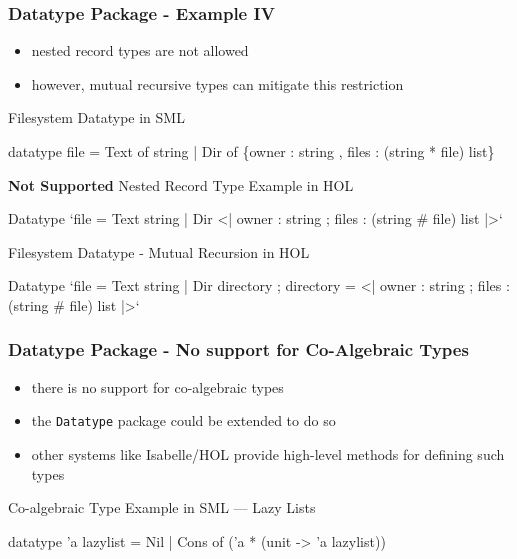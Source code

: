 \begin{frame}[fragile]
\frametitle{Datatype Package - Example IV}
\begin{itemize}
\item nested record types are not allowed
\item however, mutual recursive types can mitigate this restriction
\end{itemize}

\begin{block}{Filesystem Datatype in SML}
\begin{semiverbatim}\scriptsize
datatype file = Text of string
              | Dir of \{owner : string ,
                        files : (string * file) list\}
\end{semiverbatim}
\end{block}             

\begin{alertblock}{\textbf{Not Supported} Nested Record Type Example in HOL}
\begin{semiverbatim}\scriptsize
Datatype `file = Text string
               | Dir <| owner : string ;
                        files : (string # file) list |>`
\end{semiverbatim}
\end{alertblock}                  

\begin{block}{Filesystem Datatype - Mutual Recursion in HOL}
\begin{semiverbatim}\scriptsize
Datatype `file = Text string
               | Dir directory
          ;
          directory = <| owner : string ;
                         files : (string # file) list |>`
\end{semiverbatim}
\end{block}                   
\end{frame}


\begin{frame}[fragile]
\frametitle{Datatype Package - No support for Co-Algebraic Types}
\begin{itemize}
\item there is no support for co-algebraic types
\item the \texttt{Datatype} package could be extended to do so
\item other systems like Isabelle/HOL provide high-level methods for defining such types
\end{itemize}
\begin{block}{Co-algebraic Type Example in SML --- Lazy Lists}
\begin{semiverbatim}\scriptsize
datatype 'a lazylist = Nil
                     | Cons of ('a * (unit -> 'a lazylist))
\end{semiverbatim}
\end{block}                   
\end{frame}


